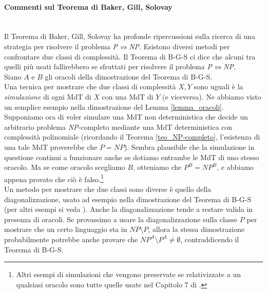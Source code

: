 \documentclass[12pt,a4paper]{report}
\theoremstyle{definition}
\begin{document}
\paragraph{Commenti sul Teorema di Baker, Gill, Solovay}\ \\
Il Teorema di Baker, Gill, Solovay ha profonde ripercussioni sulla ricerca di una strategia per risolvere il problema \emph{P vs NP}. Esistono diversi metodi per confrontare due classi di complessità. Il Teorema di B-G-S ci dice che alcuni tra quelli più usati fallirebbero se sfruttati per risolvere il problema \emph{P vs NP}.\\
Siano $A$ e $B$ gli oracoli della dimostrazione del Teorema di B-G-S.\\
Una tecnica per mostrare che due classi di complessità $X, Y$ sono uguali è la \emph{simulazione} di ogni MdT di $X$ con una MdT di $Y$ (e viceversa). Ne abbiamo visto un semplice esempio nella dimostrazione del Lemma \ref{lemma_oracoli}. Supponiamo ora di voler simulare una MdT non deterministica che decide un arbitrario problema \emph{NP}-completo mediante una MdT deterministica con complessità polinomiale (ricordando il Teorema \ref{teo_NP-completo}, l'esistenza di una tale MdT proverebbe che $P=NP$). Sembra plausibile che la simulazione in questione continui a funzionare anche se dotiamo entrambe le MdT di uno stesso oracolo. Ma se come oracolo scegliamo $B$, otteniamo che $P^B = NP^B$, e abbiamo appena provato che ciò è falso.\footnote{Altri esempi di simulazioni che vengono preservate se relativizzate a un qualsiasi oracolo sono tutte quelle usate nel Capitolo 7 di \cite{Ullman:tesi}.}\\
Un metodo per mostrare che due classi sono diverse è quello della diagonalizzazione, usato ad esempio nella dimostrazione del Teorema di B-G-S (per altri esempi si veda \cite[Teorema 12.8 e 12.9]{Ullman:tesi}). Anche la diagonalizzazione tende a restare valida in presenza di oracoli. Se provassimo a usare la diagonalizzazione sulla classe $P$ per mostrare che un certo linguaggio sta in $NP \setminus P$, allora la stessa dimostrazione probabilmente potrebbe anche provare che $NP^A \setminus P^A \neq \emptyset$, contraddicendo il Teorema di B-G-S.\\
\end{document}
